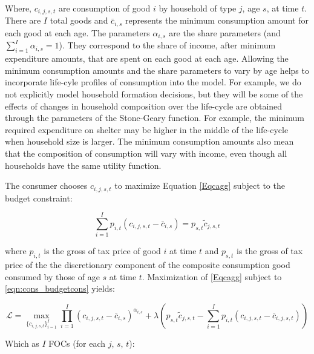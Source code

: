Where, $c_{i,j,s,t}$ are consumption of good $i$ by household of type $j$, age $s$, at time $t$.  There are $I$ total goods and $\bar{c}_{i,s}$ represents the minimum consumption amount for each good at each age.  The parameters $\alpha_{i,s}$ are the share parameters (and $\sum_{i=1}^{I} \alpha_{i,s}=1$).  They correspond to the share of income, after minimum expenditure amounts, that are spent on each good at each age.  Allowing the minimum consumption amounts and the share parameters to vary by age helps to incorporate life-cyle profiles of consumption into the model.  For example, we do not explicitly model household formation decisions, but they will be some of the effects of changes in household composition over the life-cycle are obtained through the parameters of the Stone-Geary function.  For example, the minimum required expenditure on shelter may be higher in the middle of the life-cycle when household size is larger.  The minimum consumption amounts also mean that the composition of consumption will vary with income, even though all households have the same utility function.

The consumer chooses $c_{i,j,s,t}$ to maximize Equation \ref{Eqcagg} subject to the budget constraint:

    \begin{equation} \label{eqn:cons_budgetcons}
        \sum_{i=1}^{I} p_{i,t}(c_{i,j,s,t}-\bar{c}_{i,s})  = p_{s,t}\tilde{c}_{j,s,t}
    \end{equation}

\noindent where $p_{i,t}$ is the gross of tax price of good $i$ at time $t$ and $p_{s,t}$ is the gross of tax price of the the discretionary component of the composite consumption good consumed by those of age $s$ at time $t$.  Maximization of \ref{Eqcagg} subject to \ref{eqn:cons_budgetcons} yields:

    \begin{equation} \label{eqn:cons_lagrangian}
       \mathcal{L} =  \max_{\{c_{i,j,s,t}\}_{i=1}^{I}}  \prod_{i=1}^I \left( c_{i,j,s,t} - \bar c_{i,s} \right) ^{\alpha_{i,s}}  + \lambda \left(p_{s,t}\tilde{c}_{j,s,t} - \sum_{i=1}^{I} p_{i,t}(c_{i,j,s,t}-\bar{c}_{i,j,s,t})\right)
    \end{equation}
    
    Which as $I$ FOCs (for each $j$, $s$, $t$):
    
